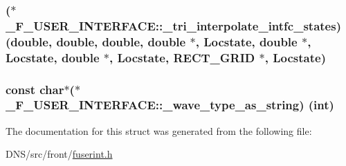 \subsubsection[{\texorpdfstring{\+\_\+tri\+\_\+interpolate\+\_\+intfc\+\_\+states}{_tri_interpolate_intfc_states}}]{($\ast$ \+\_\+\+F\+\_\+\+U\+S\+E\+R\+\_\+\+I\+N\+T\+E\+R\+F\+A\+C\+E\+::\+\_\+tri\+\_\+interpolate\+\_\+intfc\+\_\+states) (double, double, double, double $\ast$, {\bf Locstate}, double $\ast$, {\bf Locstate}, double $\ast$, {\bf Locstate}, {\bf R\+E\+C\+T\+\_\+\+G\+R\+ID} $\ast$, {\bf Locstate})}\hypertarget{struct___f___u_s_e_r___i_n_t_e_r_f_a_c_e_a882929409fe04e6ca1f7d1089ecce72f}{}\label{struct___f___u_s_e_r___i_n_t_e_r_f_a_c_e_a882929409fe04e6ca1f7d1089ecce72f}
\subsubsection[{\texorpdfstring{\+\_\+wave\+\_\+type\+\_\+as\+\_\+string}{_wave_type_as_string}}]{\setlength{\rightskip}{0pt plus 5cm}const char$\ast$($\ast$ \+\_\+\+F\+\_\+\+U\+S\+E\+R\+\_\+\+I\+N\+T\+E\+R\+F\+A\+C\+E\+::\+\_\+wave\+\_\+type\+\_\+as\+\_\+string) (int)}\hypertarget{struct___f___u_s_e_r___i_n_t_e_r_f_a_c_e_ade08347f6b4068c90ea8b0b2c2090391}{}\label{struct___f___u_s_e_r___i_n_t_e_r_f_a_c_e_ade08347f6b4068c90ea8b0b2c2090391}


The documentation for this struct was generated from the following file\+:\begin{DoxyCompactItemize}
\item 
D\+N\+S/src/front/\hyperlink{fuserint_8h}{fuserint.\+h}\end{DoxyCompactItemize}
